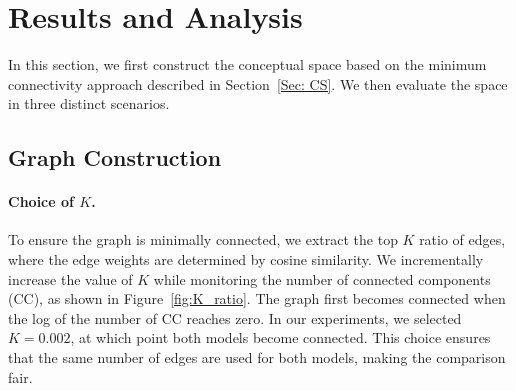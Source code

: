 


\section{Results and Analysis}
\label{sec:results}
In this section, we first construct the conceptual space based on the minimum connectivity approach described in Section~\ref{Sec: CS}. We then evaluate the space in three distinct scenarios.

\subsection{Graph Construction}
\label{section:GC}
\paragraph{Choice of $K$.}
To ensure the graph is minimally connected, we extract the top $K$ ratio of edges, where the edge weights are determined by cosine similarity. We incrementally increase the value of $K$ while monitoring the number of connected components (CC), as shown in Figure~\ref{fig:K_ratio}. The graph first becomes connected when the log of the number of CC reaches zero. In our experiments, we selected $K=0.002$, at which point both models become connected. This choice ensures that the same number of edges are used for both models, making the comparison fair.

